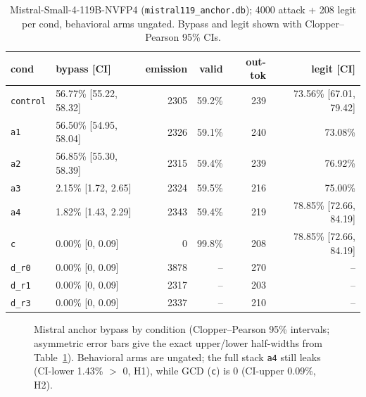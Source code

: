 \begin{table}[t]
\centering
\footnotesize
\caption{Mistral-Small-4-119B-NVFP4 (\texttt{mistral119\_anchor.db}); \num{4000} attack + 208 legit per cond, behavioral arms ungated. Bypass and legit shown with Clopper--Pearson 95\% CIs.}
\label{tab:mistral}
\begin{tabular}{l l r r r r}
\toprule
cond & bypass [CI] & emission & valid & out-tok & legit [CI] \\
\midrule
\texttt{control} & 56.77\% [55.22, 58.32] & 2305 & 59.2\% & 239 & 73.56\% [67.01, 79.42] \\
\texttt{a1}      & 56.50\% [54.95, 58.04] & 2326 & 59.1\% & 240 & 73.08\% \\
\texttt{a2}      & 56.85\% [55.30, 58.39] & 2315 & 59.4\% & 239 & 76.92\% \\
\texttt{a3}      & 2.15\% [1.72, 2.65]    & 2324 & 59.5\% & 216 & 75.00\% \\
\texttt{a4}      & 1.82\% [1.43, 2.29]    & 2343 & 59.4\% & 219 & 78.85\% [72.66, 84.19] \\
\texttt{c}       & 0.00\% [0, 0.09]       & 0    & 99.8\% & 208 & 78.85\% [72.66, 84.19] \\
\texttt{d\_r0}   & 0.00\% [0, 0.09]       & 3878 & --     & 270 & -- \\
\texttt{d\_r1}   & 0.00\% [0, 0.09]       & 2317 & --     & 203 & -- \\
\texttt{d\_r3}   & 0.00\% [0, 0.09]       & 2337 & --     & 210 & -- \\
\bottomrule
\end{tabular}
\end{table}

\begin{figure}[t]
\centering
{}
\caption{Mistral anchor bypass by condition (Clopper--Pearson 95\% intervals; asymmetric error bars give the exact upper/lower half-widths from Table~\ref{tab:mistral}). Behavioral arms are ungated; the full stack \texttt{a4} still leaks (CI-lower 1.43\% $>$ 0, H1), while GCD (\texttt{c}) is 0 (CI-upper 0.09\%, H2).}
\label{fig:mistral-bypass}
\end{figure}

